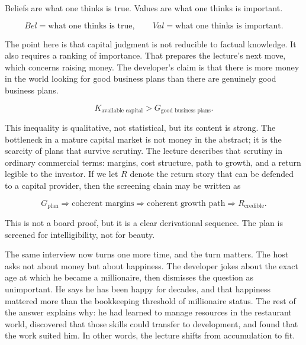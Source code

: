 \begin{definition}
Beliefs are what one thinks is true. Values are what one thinks is important.
\end{definition}

\begin{equation}
Bel = \text{what one thinks is true}, \qquad
Val = \text{what one thinks is important}.
\end{equation}

The point here is that capital judgment is not reducible to factual knowledge. It also requires a ranking of importance. That prepares the lecture's next move, which concerns raising money. The developer's claim is that there is more money in the world looking for good business plans than there are genuinely good business plans.

\begin{equation}
K_{\text{available capital}} > G_{\text{good business plans}}.
\end{equation}

This inequality is qualitative, not statistical, but its content is strong. The bottleneck in a mature capital market is not money in the abstract; it is the scarcity of plans that survive scrutiny. The lecture describes that scrutiny in ordinary commercial terms: margins, cost structure, path to growth, and a return legible to the investor. If we let \(R\) denote the return story that can be defended to a capital provider, then the screening chain may be written as

\begin{equation}
G_{\text{plan}} \Rightarrow \text{coherent margins} \Rightarrow \text{coherent growth path} \Rightarrow R_{\text{credible}}.
\end{equation}

This is not a board proof, but it is a clear derivational sequence. The plan is screened for intelligibility, not for beauty.

The same interview now turns one more time, and the turn matters. The host asks not about money but about happiness. The developer jokes about the exact age at which he became a millionaire, then dismisses the question as unimportant. He says he has been happy for decades, and that happiness mattered more than the bookkeeping threshold of millionaire status. The rest of the answer explains why: he had learned to manage resources in the restaurant world, discovered that those skills could transfer to development, and found that the work suited him. In other words, the lecture shifts from accumulation to fit.

